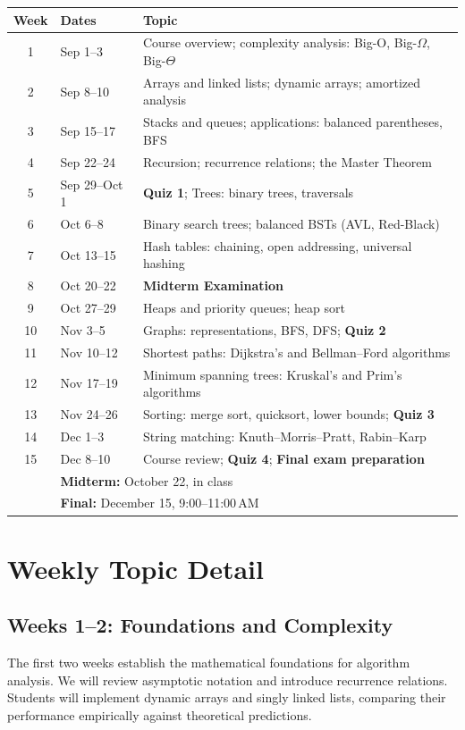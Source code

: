 \documentclass[
    language=english,
    doctype=course-material,
    institution=none,
]{../../omnilatex}
\newcommand{\scheduleentry}[3]{#1 & #2 & #3 \\}
\begin{document}
\small
\begin{tabular}{@{}clp{8cm}@{}}
    \toprule
    \textbf{Week} & \textbf{Dates} & \textbf{Topic} \\
    \midrule
    \scheduleentry{1}{Sep 1--3}{Course overview; complexity analysis: Big-O, Big-$\Omega$, Big-$\Theta$}
    \scheduleentry{2}{Sep 8--10}{Arrays and linked lists; dynamic arrays; amortized analysis}
    \scheduleentry{3}{Sep 15--17}{Stacks and queues; applications: balanced parentheses, BFS}
    \scheduleentry{4}{Sep 22--24}{Recursion; recurrence relations; the Master Theorem}
    \scheduleentry{5}{Sep 29--Oct 1}{\textbf{Quiz 1}; Trees: binary trees, traversals}
    \scheduleentry{6}{Oct 6--8}{Binary search trees; balanced BSTs (AVL, Red-Black)}
    \scheduleentry{7}{Oct 13--15}{Hash tables: chaining, open addressing, universal hashing}
    \scheduleentry{8}{Oct 20--22}{\textbf{Midterm Examination}}
    \scheduleentry{9}{Oct 27--29}{Heaps and priority queues; heap sort}
    \scheduleentry{10}{Nov 3--5}{Graphs: representations, BFS, DFS; \textbf{Quiz 2}}
    \scheduleentry{11}{Nov 10--12}{Shortest paths: Dijkstra's and Bellman--Ford algorithms}
    \scheduleentry{12}{Nov 17--19}{Minimum spanning trees: Kruskal's and Prim's algorithms}
    \scheduleentry{13}{Nov 24--26}{Sorting: merge sort, quicksort, lower bounds; \textbf{Quiz 3}}
    \scheduleentry{14}{Dec 1--3}{String matching: Knuth--Morris--Pratt, Rabin--Karp}
    \scheduleentry{15}{Dec 8--10}{Course review; \textbf{Quiz 4}; \textbf{Final exam preparation}}
    \midrule
    & \multicolumn{2}{l}{\textbf{Midterm:} October 22, in class} \\
    & \multicolumn{2}{l}{\textbf{Final:} December 15, 9:00--11:00\,AM} \\
    \bottomrule
\end{tabular}

\section{Weekly Topic Detail}

\subsection{Weeks 1--2: Foundations and Complexity}

The first two weeks establish the mathematical foundations for algorithm
analysis.  We will review asymptotic notation and introduce recurrence
relations.  Students will implement dynamic arrays and singly linked lists,
comparing their performance empirically against theoretical predictions.
\end{document}
